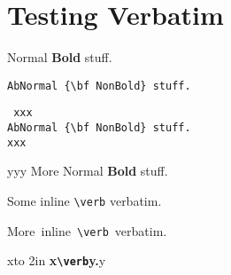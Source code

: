 \documentclass{article}
\begin{document}
\section{Testing Verbatim}
Normal {\bf Bold} stuff.

\begin{verbatim}
AbNormal {\bf NonBold} stuff.
\end{verbatim}

\begin{verbatim} xxx
AbNormal {\bf NonBold} stuff.
xxx    \end{verbatim} yyy
More Normal {\bf Bold} stuff.


Some inline \verb|\verb| verbatim.

\hbox{More inline \verb|\verb| verbatim.}

x\hbox to 2in  {\bf x\verb|\verb|y.}y
\end{document}
